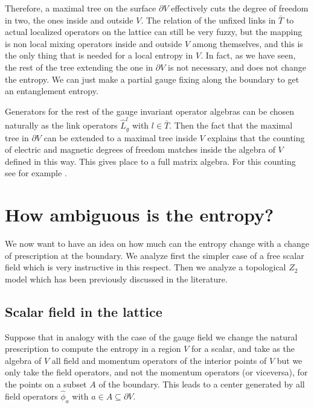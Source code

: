 \documentclass[12pt,a4paper]{article}
\begin{document}
Therefore, a maximal tree on the surface $\partial V$ effectively cuts the degree of freedom in two, the ones inside and outside $V$. 
The relation of the unfixed links in $\bar{T}$ to actual localized operators on the lattice can still be very fuzzy, but the mapping 
is non local mixing operators inside and outside $V$ among themselves, and this is the only thing that is needed for a local entropy in $V$. 
In fact, as we have seen, the rest of the tree extending the one in $\partial V$ is not necessary, and does not change the entropy. We can just make a partial gauge fixing along the boundary to 
get an entanglement entropy.

Generators for the rest of the gauge invariant operator algebras can be chosen naturally as the link operators $\hat{L}_g^l$ with $l\in \bar{T}$. 
Then the fact that the maximal tree in $\partial V$ can be extended to a maximal tree inside $V$ explains that the counting of electric and magnetic degrees of freedom matches inside the algebra of $V$ defined in this way. This  gives place to a full matrix algebra. For 
this counting see for example \cite{bishop}. 





\section{How ambiguous is the entropy?}
We now want to have an idea on how much can the entropy change with a change of prescription at the boundary. We analyze first the 
simpler case of a free scalar field which is very instructive in this respect. Then we analyze a topological $Z_2$ model which has been 
previously discussed in the literature. 

\subsection{Scalar field in the lattice}

Suppose that in analogy with the case of the gauge field we change the natural prescription to compute the entropy in a region $V$ 
for a scalar, and take as the algebra of $V$ all field and momentum operators of the interior points of $V$ but we only take the field 
operators, and not the momentum operators (or viceversa), for the points on a subset $A$ of the boundary. This leads to a center generated by all field operators $\hat{\phi}_a$ with $a\in A\subseteq  \partial V$. 
\end{document}
